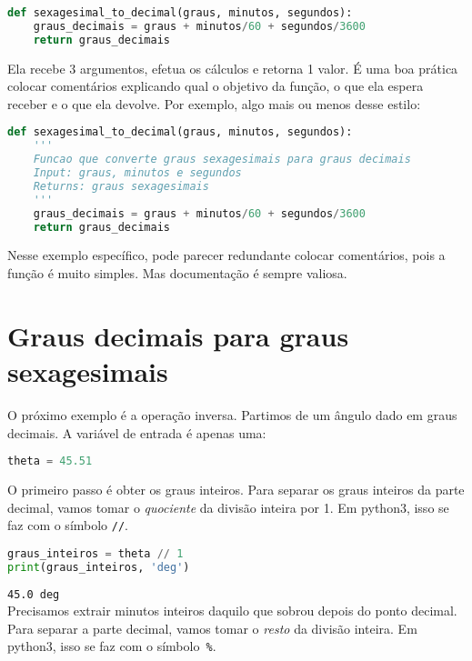 \begin{lstlisting}[language=Python]
def sexagesimal_to_decimal(graus, minutos, segundos):
    graus_decimais = graus + minutos/60 + segundos/3600
    return graus_decimais
\end{lstlisting}

\noindent Ela recebe 3 argumentos, efetua os cálculos e retorna 1 valor. É uma boa prática colocar comentários explicando qual o objetivo da função, o que ela espera receber e o que ela devolve. Por exemplo, algo mais ou menos desse estilo:

\begin{lstlisting}[language=Python]
def sexagesimal_to_decimal(graus, minutos, segundos):
    '''
    Funcao que converte graus sexagesimais para graus decimais
    Input: graus, minutos e segundos
    Returns: graus sexagesimais
    '''
    graus_decimais = graus + minutos/60 + segundos/3600
    return graus_decimais
\end{lstlisting}

\noindent Nesse exemplo específico, pode parecer redundante colocar comentários, pois a função é muito simples. Mas documentação é sempre valiosa.

\section{Graus decimais para graus sexagesimais}

O próximo exemplo é a operação inversa. Partimos de um ângulo dado em graus decimais. A variável de entrada é apenas uma:

\begin{lstlisting}[language=Python]
theta = 45.51
\end{lstlisting}

\noindent O primeiro passo é obter os graus inteiros. Para separar os graus inteiros da parte decimal, vamos tomar o \textit{quociente} da divisão inteira por 1. Em python3, isso se faz com o símbolo \texttt{//}.

\begin{lstlisting}[language=Python]
graus_inteiros = theta // 1
print(graus_inteiros, 'deg')
\end{lstlisting}
\noindent\texttt{45.0 deg}\\

\noindent Precisamos extrair minutos inteiros daquilo que sobrou depois do ponto decimal. Para separar a parte decimal, vamos tomar o \textit{resto} da divisão inteira. Em python3, isso se faz com
o símbolo~\texttt{\%}.

